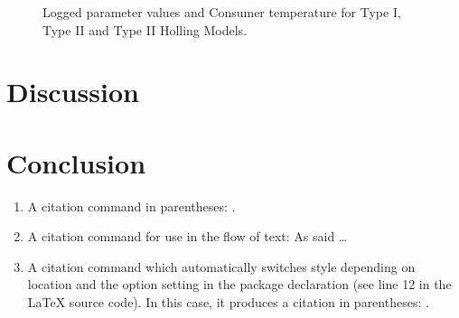 \documentclass{article}
\begin{document}
\begin{figure}[ht]
\caption{Logged parameter values and Consumer temperature for Type I, Type II and Type II Holling Models.}
\label{fig:tempparam}
\end{figure}

\section{Discussion}
\section{Conclusion}

\clearpage{}


\begin{enumerate}
\item A citation command in parentheses: \parencite{hollingsawfly1959}.
\item A citation command for use in the flow of text: As \textcite{Holling1966} said \dots
\item A citation command which automatically switches style depending on location and the option setting in the package declaration (see line 12 in the LaTeX source code). In this case, it produces a citation in parentheses: \autocite{hollingsawfly1959}.
\end{enumerate}
\end{document}
